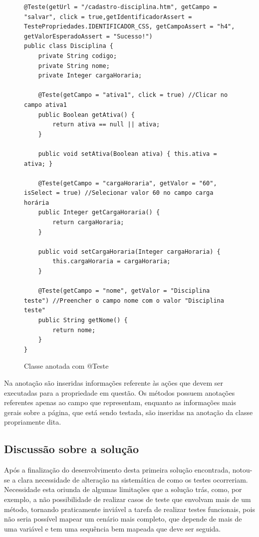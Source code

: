 \documentclass[tg]{mdtufsm}
\begin{document}
\begin{figure}[!htt]
\begin{lstlisting}
@Teste(getUrl = "/cadastro-disciplina.htm", getCampo = "salvar", click = true,getIdentificadorAssert = TestePropriedades.IDENTIFICADOR_CSS, getCampoAssert = "h4", getValorEsperadoAssert = "Sucesso!")
public class Disciplina {
    private String codigo;
    private String nome;
    private Integer cargaHoraria;

    @Teste(getCampo = "ativa1", click = true) //Clicar no campo ativa1
    public Boolean getAtiva() {
        return ativa == null || ativa;
    }

    public void setAtiva(Boolean ativa) { this.ativa = ativa; }

    @Teste(getCampo = "cargaHoraria", getValor = "60", isSelect = true) //Selecionar valor 60 no campo carga horária
    public Integer getCargaHoraria() {
        return cargaHoraria;
    }

    public void setCargaHoraria(Integer cargaHoraria) {
        this.cargaHoraria = cargaHoraria;
    }

    @Teste(getCampo = "nome", getValor = "Disciplina teste") //Preencher o campo nome com o valor "Disciplina teste"
    public String getNome() {
        return nome;
    }
}
\end{lstlisting}
	\caption{Classe anotada com @Teste}
	\label{code:Disciplina.java}
\end{figure}

Na anotação são inseridas informações referente às ações que devem ser executadas para a propriedade em questão. Os métodos possuem anotações referentes apenas ao campo que representam, enquanto as informações mais gerais sobre
a página, que está sendo testada, são inseridas na anotação da classe propriamente dita.

\subsection{Discussão sobre a solução}
Após a finalização do desenvolvimento desta primeira solução encontrada, notou-se a clara necessidade de alteração na sistemática de como os testes ocorreriam. Necessidade esta oriunda de algumas limitações que a solução trás,
como, por exemplo, a não possibilidade de realizar casos de teste que envolvam mais de um método, tornando praticamente inviável a tarefa de realizar testes funcionais, pois não seria possível mapear um cenário mais completo, que depende
de mais de uma variável e tem uma sequência bem mapeada que deve ser seguida.
\end{document}
